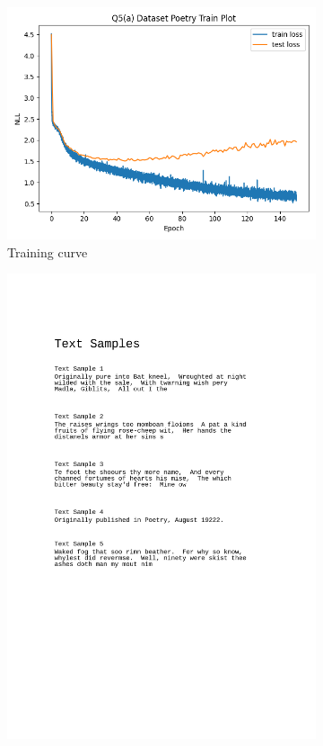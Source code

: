 \documentclass{article}
\begin{document}
\begin{enumerate}[(a)]
\begin{figure}[H]
    \centering
    \begin{subfigure}{0.3\textwidth}
        \centering
        \includegraphics[width=\textwidth]{figures/q5_a_train_plot.png}
        \caption{Training curve}
    \end{subfigure}
    \hspace{0.2in}
    \begin{subfigure}{0.65\textwidth}
        \centering
        \includegraphics[width=\textwidth]{figures/q5_a_samples.png}

\end{subfigure}
\end{figure}
\end{enumerate}
\end{document}

